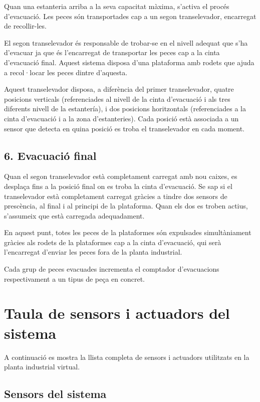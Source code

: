 \documentclass[12pt,a4paper]{report}
\begin{document}
Quan una estanteria arriba a la seva capacitat màxima, s'activa el procés d'evacuació. Les peces són transportades cap a un segon transelevador, encarregat de recollir-les.

El segon transelevador és responsable de trobar-se en el nivell adequat que s'ha d'evacuar ja que és l'encarregat de transportar les peces cap a la cinta d'evacuació final. Aquest sistema disposa d'una plataforma amb rodets que ajuda a recol·locar les peces dintre d'aquesta. 

Aquest transelevador disposa, a diferència del primer transelevador, quatre posicions verticals (referenciades al nivell de la cinta d'evacuació i als tres diferents nivell de la estantería), i dos posicions horitzontals (referenciades a la cinta d'evacuació i a la zona d'estanteries). Cada posició està associada a un sensor que detecta en quina posició es troba el transelevador en cada moment.

\subsection*{6. Evacuació final}
Quan el segon transelevador està completament carregat amb nou caixes, es desplaça fins a la posició final on es troba la cinta d'evacuació. Se sap si el transelevador està completament carregat gràcies a tindre dos sensors de prescència, al final i al principi de la plataforma. Quan els dos es troben actius, s'assumeix que està carregada adequadament.

En aquest punt, totes les peces de la plataformes són expulsades simultàniament gràcies als rodets de la plataformes cap a la cinta d'evacuació, qui serà l'encarregat d'enviar les peces fora de la planta industrial.

Cada grup de peces evacuades incrementa el comptador d'evacuacions respectivament a un tipus de peça en concret.

\section{Taula de sensors i actuadors del sistema}

A continuació es mostra la llista completa de sensors i actuadors utilitzats en la planta industrial virtual.

\subsection{Sensors del sistema}
\end{document}
